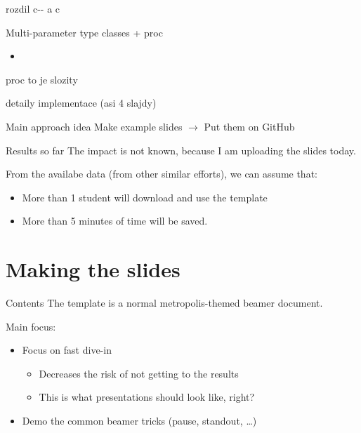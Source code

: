 \documentclass[aspectratio=169]{beamer}
\begin{document}
\begin{frame}{rozdil c-{}- a c}
\end{frame}

\begin{frame}{Multi-parameter type classes + proc}
  \begin{itemize}
    \item 
  \end{itemize}
\end{frame}

\begin{frame}{proc to je slozity}
\end{frame}

\begin{frame}{detaily implementace (asi 4 slajdy)}
\end{frame}

\begin{frame}[standout]{Main approach idea}
Make example slides
$\to$
Put them on GitHub
\end{frame}

\begin{frame}{Results so far}
The impact is not known, because I am uploading the slides today.

\pause
From the availabe data (from other similar efforts), we can assume that:
\begin{itemize}
\item \alert<2>{More than 1 student will download and use the template}
\item \alert<3>{More than 5 minutes of time will be saved.} 
\end{itemize}
\end{frame}

\section{Making the slides}

\begin{frame}{Contents}
The template is a normal metropolis-themed beamer document.

Main focus:
\begin{itemize}
\item Focus on fast dive-in \pause
  \begin{itemize}
  \item Decreases the risk of not getting to the results
  \item This is what presentations should look like, right? \pause
  \end{itemize}
\item Demo the common beamer tricks (pause, standout, \dots)
\end{itemize}
\end{frame}
\end{document}
